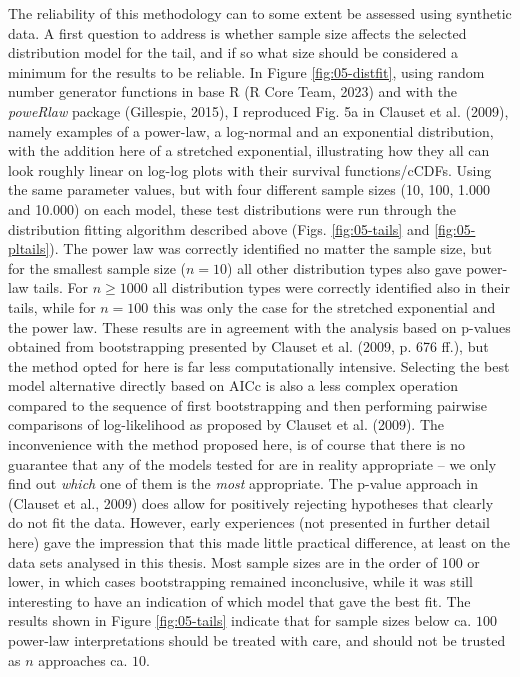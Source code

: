 \documentclass[
  12pt,
]{book}
\begin{document}
The reliability of this methodology can to some extent be assessed using synthetic data. A first question to address is whether sample size affects the selected distribution model for the tail, and if so what size should be considered a minimum for the results to be reliable. In Figure \ref{fig:05-distfit}, using random number generator functions in base R (R Core Team, 2023) and with the \emph{poweRlaw} package (Gillespie, 2015), I reproduced Fig. 5a in Clauset et al. (2009), namely examples of a power-law, a log-normal and an exponential distribution, with the addition here of a stretched exponential, illustrating how they all can look roughly linear on log-log plots with their survival functions/cCDFs. Using the same parameter values, but with four different sample sizes (10, 100, 1.000 and 10.000) on each model, these test distributions were run through the distribution fitting algorithm described above (Figs. \ref{fig:05-tails} and \ref{fig:05-pltails}). The power law was correctly identified no matter the sample size, but for the smallest sample size (\(n = 10\)) all other distribution types also gave power-law tails. For \(n \geq 1000\) all distribution types were correctly identified also in their tails, while for \(n = 100\) this was only the case for the stretched exponential and the power law. These results are in agreement with the analysis based on p-values obtained from bootstrapping presented by Clauset et al. (2009, p. 676 ff.), but the method opted for here is far less computationally intensive. Selecting the best model alternative directly based on AICc is also a less complex operation compared to the sequence of first bootstrapping and then performing pairwise comparisons of log-likelihood as proposed by Clauset et al. (2009). The inconvenience with the method proposed here, is of course that there is no guarantee that any of the models tested for are in reality appropriate -- we only find out \emph{which} one of them is the \emph{most} appropriate. The p-value approach in (Clauset et al., 2009) does allow for positively rejecting hypotheses that clearly do not fit the data. However, early experiences (not presented in further detail here) gave the impression that this made little practical difference, at least on the data sets analysed in this thesis. Most sample sizes are in the order of \(100\) or lower, in which cases bootstrapping remained inconclusive, while it was still interesting to have an indication of which model that gave the best fit. The results shown in Figure \ref{fig:05-tails} indicate that for sample sizes below ca. \(100\) power-law interpretations should be treated with care, and should not be trusted as \(n\) approaches ca. \(10\).
\end{document}
